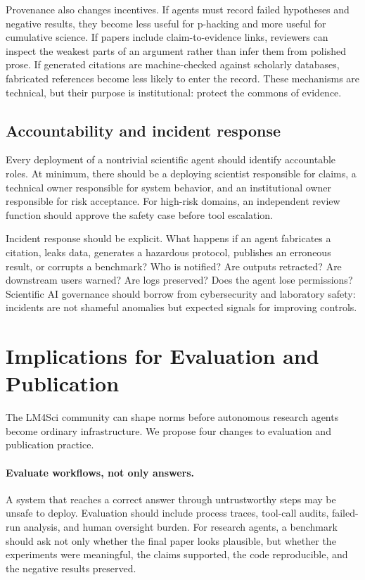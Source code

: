 \documentclass{article}
\begin{document}
Provenance also changes incentives. If agents must record failed hypotheses and negative results, they become less useful for p-hacking and more useful for cumulative science. If papers include claim-to-evidence links, reviewers can inspect the weakest parts of an argument rather than infer them from polished prose. If generated citations are machine-checked against scholarly databases, fabricated references become less likely to enter the record. These mechanisms are technical, but their purpose is institutional: protect the commons of evidence.

\subsection{Accountability and incident response}

Every deployment of a nontrivial scientific agent should identify accountable roles. At minimum, there should be a deploying scientist responsible for claims, a technical owner responsible for system behavior, and an institutional owner responsible for risk acceptance. For high-risk domains, an independent review function should approve the safety case before tool escalation.

Incident response should be explicit. What happens if an agent fabricates a citation, leaks data, generates a hazardous protocol, publishes an erroneous result, or corrupts a benchmark? Who is notified? Are outputs retracted? Are downstream users warned? Are logs preserved? Does the agent lose permissions? Scientific AI governance should borrow from cybersecurity and laboratory safety: incidents are not shameful anomalies but expected signals for improving controls.

\section{Implications for Evaluation and Publication}

The LM4Sci community can shape norms before autonomous research agents become ordinary infrastructure. We propose four changes to evaluation and publication practice.

\paragraph{Evaluate workflows, not only answers.} A system that reaches a correct answer through untrustworthy steps may be unsafe to deploy. Evaluation should include process traces, tool-call audits, failed-run analysis, and human oversight burden. For research agents, a benchmark should ask not only whether the final paper looks plausible, but whether the experiments were meaningful, the claims supported, the code reproducible, and the negative results preserved.
\end{document}
